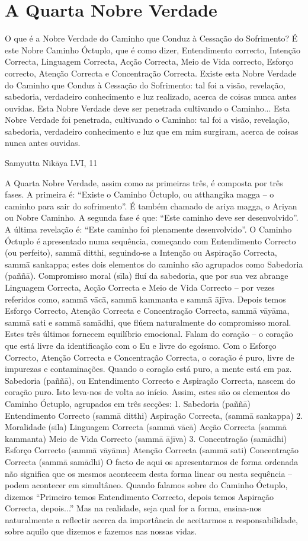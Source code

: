 \chapter{A Quarta Nobre Verdade}

O que é a Nobre Verdade do Caminho que
Conduz à Cessação do Sofrimento? É este Nobre
Caminho Óctuplo, que é como dizer, Entendimento
correcto, Intenção Correcta, Linguagem Correcta,
Acção Correcta, Meio de Vida correcto, Esforço
correcto, Atenção Correcta e Concentração Correcta.
Existe esta Nobre Verdade do Caminho que
Conduz à Cessação do Sofrimento: tal foi a visão,
revelação, sabedoria, verdadeiro conhecimento e
luz realizado, acerca de coisas nunca antes ouvidas.
Esta Nobre Verdade deve ser penetrada cultivando o Caminho...
Esta Nobre Verdade foi penetrada, cultivando o
Caminho: tal foi a visão, revelação, sabedoria,
verdadeiro conhecimento e luz que em mim surgiram,
acerca de coisas nunca antes ouvidas.

Samyutta Nikāya LVI, 11

A Quarta Nobre Verdade, assim como as primeiras três,
é composta por três fases. A primeira é: “Existe o Caminho
Óctuplo, ou atthangika magga – o caminho para sair do sofrimento”. É também chamado de ariya magga, o Ariyan ou
Nobre Caminho. A segunda fase é que: “Este caminho deve
ser desenvolvido”. A última revelação é: “Este caminho foi
plenamente desenvolvido”.
O Caminho Óctuplo é apresentado numa sequência,
começando com Entendimento Correcto (ou perfeito), sammā
ditthi, seguindo-se a Intenção ou Aspiração Correcta, sammā
sankappa; estes dois elementos do caminho são agrupados
como Sabedoria (paññā). Compromisso moral (sīla) fluí da
sabedoria, que por sua vez abrange Linguagem Correcta,
Acção Correcta e Meio de Vida Correcto – por vezes referidos como, sammā vācā, sammā kammanta e sammā ājīva.
Depois temos Esforço Correcto, Atenção Correcta e
Concentração Correcta, sammā vāyāma, sammā sati e sammā
samādhi, que flúem naturalmente do compromisso moral.
Estes três últimos fornecem equilíbrio emocional. Falam do
coração – o coração que está livre da identificação com o Eu
e livre do egoísmo. Com o Esforço Correcto, Atenção
Correcta e Concentração Correcta, o coração é puro, livre de
impurezas e contaminações. Quando o coração está puro, a
mente está em paz. Sabedoria (paññā), ou Entendimento
Correcto e Aspiração Correcta, nascem do coração puro. Isto
leva-nos de volta ao início.
Assim, estes são os elementos do Caminho Óctuplo,
agrupados em três secções:
1. Sabedoria (paññā)
Entendimento Correcto (sammā ditthi)
Aspiração Correcta, (sammā sankappa)
2. Moralidade (sīla)
Linguagem Correcta (sammā vācā)
Acção Correcta (sammā kammanta)
Meio de Vida Correcto (sammā ājīva)
3. Concentração (samādhi)
Esforço Correcto (sammā vāyāma)
Atenção Correcta (sammā sati)
Concentração Correcta (sammā samādhi)
O facto de aqui os apresentarmos de forma ordenada não
significa que os mesmos acontecem desta forma linear ou
nesta sequência – podem acontecer em simultâneo. Quando
falamos sobre do Caminho Óctuplo, dizemos “Primeiro
temos Entendimento Correcto, depois temos Aspiração
Correcta, depois...” Mas na realidade, seja qual for a forma,
ensina-nos naturalmente a reflectir acerca da importância de
aceitarmos a responsabilidade, sobre aquilo que dizemos e
fazemos nas nossas vidas.

